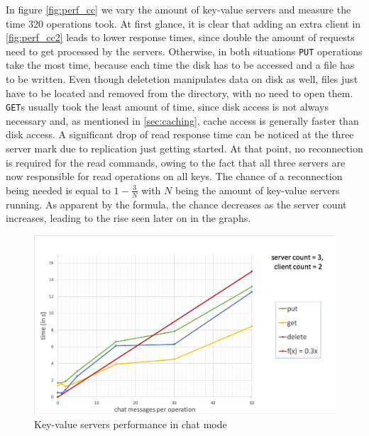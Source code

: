 In figure \ref{fig:perf_cc}  we vary the amount of key-value servers and measure the time 320 operations took. At first glance, it is clear that adding an extra client in \ref{fig:perf_cc2} leads to lower response times, since double the amount of requests need to get processed by the servers. Otherwise, in both situations \texttt{PUT} operations take the most time, because each time the disk has to be accessed and a file has to be written. Even though deletetion manipulates data on disk as well, files just have to be located and removed from the directory, with no need to open them. \texttt{GET}s usually took the least amount of time, since disk access is not always necessary and, as mentioned in \ref{sec:caching}, cache access is generally faster than disk access.
A significant drop of read response time can be noticed at the three server mark due to replication just getting started. At that point, no reconnection is required for the read commands, owing to the fact that all three servers are now responsible for read operations on all keys. The chance of a reconnection being needed is equal to \begin{math}1-\frac{3}{N}\end{math} with \begin{math}N\end{math} being the amount of key-value servers running. As apparent by the formula, the chance decreases as the server count increases, leading to the rise seen later on in the graphs. 

\begin{figure}[h]
	\centering
	\includegraphics[width=0.8\linewidth]{figures/performance/chat(linear).png}
	\caption{Key-value servers performance in chat mode}
	\label{fig:perf_chat_lin}
\end{figure}

